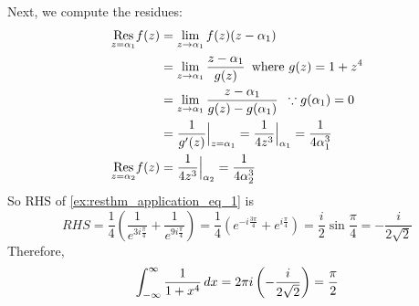 \documentclass[11pt, oneside]{book}
\begin{document}
\begin{ex}
  Next, we compute the residues:
  \begin{align*}
    \res{f(z)}{z = \alpha_1}
      &= \lim_{z \to \alpha_1} f(z)(z - \alpha_1) \\
      &= \lim_{z \to \alpha_1} \frac{z - \alpha_1}{g(z)} \enspace \text{where } g(z) = 1 + z^4 \\
      &= \lim_{z \to \alpha_1} \frac{z - \alpha_1}{g(z) - g(\alpha_1)} \enspace \because g(\alpha_1) = 0 \\
      &= \frac{1}{g'(z)} \at{z = \alpha_1}{} = \frac{1}{4z^3} \at{\alpha_1}{} = \frac{1}{4\alpha_1^3} \\
    \res{f(z)}{z = \alpha_2}
      &= \frac{1}{4z^3} \at{\alpha_2}{} = \frac{1}{4 \alpha_2^3}
  \end{align*}
  So RHS of \cref{ex:resthm_application_eq_1} is
  \begin{equation*}
    RHS = \frac{1}{4} \left( \frac{1}{e^{3i \frac{\pi}{4} }} + \frac{1}{e^{9i \frac{\pi}{4} }} \right) = \frac{1}{4} \left( e^{- i \frac{3\pi}{4} } + e^{i \frac{\pi}{4} } \right) = \frac{i}{2} \sin \frac{\pi}{4} = -\frac{i}{2 \sqrt{2}} 
  \end{equation*}
  Therefore,
  \begin{equation*}
    \int_{-\infty}^{\infty} \frac{1}{1 + x^4} \dif{x} = 2 \pi i \left(-\frac{i}{2 \sqrt{2}} \right) = \frac{\pi}{2} 
  \end{equation*}
\end{ex}
\end{document}
